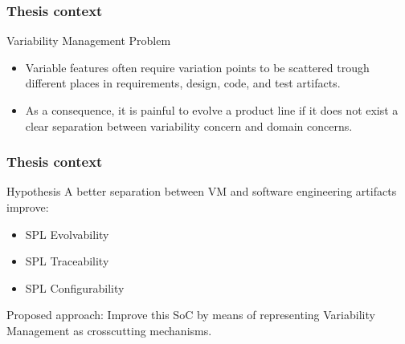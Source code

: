 \documentclass[13pt]{beamer}
\begin{document}
\begin{frame}
\frametitle{Thesis context}

\begin{block}{Variability Management Problem}
\begin{itemize}
	\item Variable features often require variation points to be scattered trough
	different places in requirements, design, code, and test artifacts.
	\item As a consequence, it is painful to evolve a product line if it does not 
	exist a clear separation between variability concern and domain concerns.
\end{itemize}
\end{block}

\end{frame}

\begin{frame}
\frametitle{Thesis context}

\begin{block}{Hypothesis}
A better separation between VM and software engineering
artifacts improve:

\begin{itemize}
  \item SPL Evolvability
  \item SPL Traceability
  \item SPL Configurability
\end{itemize}
\end{block}

\begin{block}{Proposed approach:}
Improve this SoC by means of representing Variability Management as
crosscutting mechanisms.
\end{block}
\end{frame}
\end{document}

